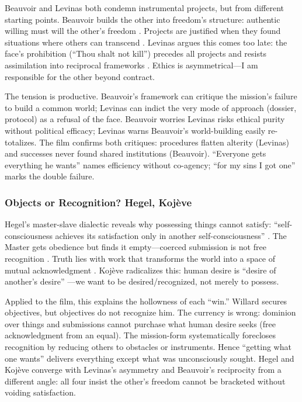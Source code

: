 Beauvoir and Levinas both condemn instrumental projects, but from different starting points.
Beauvoir builds the other into freedom's structure: authentic willing must will the other's
freedom \parencite[p.~73]{Beauvoir1976}. Projects are justified when they found situations
where others can transcend \parencite[pp.~145--153]{Beauvoir1976}. Levinas argues this comes
too late: the face's prohibition (``Thou shalt not kill'') precedes all projects and resists
assimilation into reciprocal frameworks \parencite[pp.~199, 21--24]{LevinasTI1969}. Ethics is
asymmetrical---I am responsible for the other beyond contract.

The tension is productive. Beauvoir's framework can critique the mission's failure to build a
common world; Levinas can indict the very mode of approach (dossier, protocol) as a refusal of
the face. Beauvoir worries Levinas risks ethical purity without political efficacy; Levinas
warns Beauvoir's world-building easily re-totalizes. The film confirms both critiques:
procedures flatten alterity (Levinas) and successes never found shared institutions
(Beauvoir). ``Everyone gets everything he wants'' names efficiency without co-agency; ``for my
sins I got one'' marks the double failure.

\subsubsection*{Objects or Recognition? Hegel, Kojève}

Hegel's master-slave dialectic reveals why possessing things cannot satisfy:
``self-consciousness achieves its satisfaction only in another self-consciousness''
\parencite[\S 175]{HegelPhenomenology1977}. The Master gets obedience but finds it empty---coerced
submission is not free recognition \parencite[\S\S 187--189]{HegelPhenomenology1977}. Truth
lies with work that transforms the world into a space of mutual acknowledgment
\parencite[\S 196]{HegelPhenomenology1977}. Koj{\`e}ve radicalizes this: human desire is
``desire of another's desire'' \parencite[p.~6]{KojeveIRH1980}---we want to be desired/recognized,
not merely to possess.

Applied to the film, this explains the hollowness of each ``win.'' Willard secures objectives,
but objectives do not recognize him. The currency is wrong: dominion over things and
submissions cannot purchase what human desire seeks (free acknowledgment from an equal). The
mission-form systematically forecloses recognition by reducing others to obstacles or
instruments. Hence ``getting what one wants'' delivers everything except what was unconsciously
sought. Hegel and Koj{\`e}ve converge with Levinas's asymmetry and Beauvoir's reciprocity from
a different angle: all four insist the other's freedom cannot be bracketed without voiding
satisfaction.

